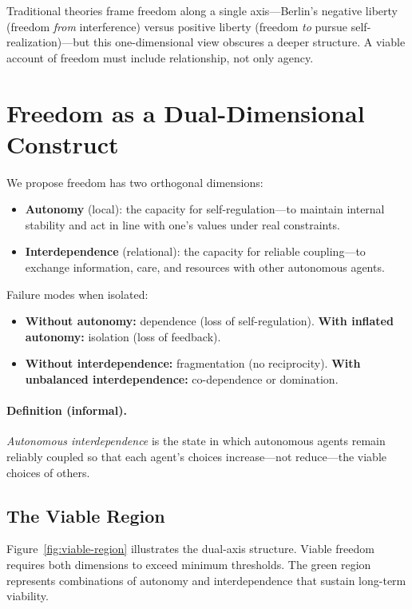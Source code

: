 \documentclass[11pt,a4paper]{article}
\begin{document}
Traditional theories frame freedom along a single axis---Berlin's negative liberty (freedom \emph{from} interference) versus positive liberty (freedom \emph{to} pursue self-realization)---but this one-dimensional view obscures a deeper structure. A viable account of freedom must include relationship, not only agency.

\section{Freedom as a Dual-Dimensional Construct}

We propose freedom has two orthogonal dimensions:
\begin{itemize}
    \item \textbf{Autonomy} (local): the capacity for self-regulation---to maintain internal stability and act in line with one's values under real constraints.
    \item \textbf{Interdependence} (relational): the capacity for reliable coupling---to exchange information, care, and resources with other autonomous agents.
\end{itemize}

\noindent Failure modes when isolated:
\begin{itemize}
    \item \textbf{Without autonomy:} dependence (loss of self-regulation). \textbf{With inflated autonomy:} isolation (loss of feedback).
    \item \textbf{Without interdependence:} fragmentation (no reciprocity). \textbf{With unbalanced interdependence:} co-dependence or domination.
\end{itemize}

\paragraph{Definition (informal).}
\emph{Autonomous interdependence} is the state in which autonomous agents remain reliably coupled so that each agent's choices increase---not reduce---the viable choices of others.

\subsection{The Viable Region}

Figure~\ref{fig:viable-region} illustrates the dual-axis structure. Viable freedom requires both dimensions to exceed minimum thresholds. The green region represents combinations of autonomy and interdependence that sustain long-term viability.
\end{document}
